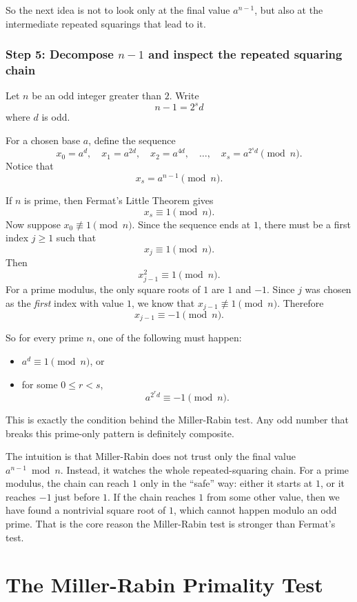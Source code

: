 \documentclass[12pt,a4paper]{report}
\begin{document}
So the next idea is not to look only at the final value \(a^{n-1}\), but also at the intermediate repeated squarings that lead to it.

\subsection{Step 5: Decompose \texorpdfstring{$n-1$}{n-1} and inspect the repeated squaring chain}
Let \(n\) be an odd integer greater than \(2\). Write
\[
n-1=2^s d
\]
where \(d\) is odd.

For a chosen base \(a\), define the sequence
\[
x_0=a^d,\quad x_1=a^{2d},\quad x_2=a^{4d},\quad \dots,\quad x_s=a^{2^s d}
\pmod{n}.
\]
Notice that
\[
x_s=a^{n-1}\pmod{n}.
\]

If \(n\) is prime, then Fermat's Little Theorem gives
\[
x_s\equiv 1 \pmod{n}.
\]
Now suppose \(x_0\not\equiv 1 \pmod{n}\). Since the sequence ends at \(1\), there must be a first index \(j\ge 1\) such that
\[
x_j\equiv 1 \pmod{n}.
\]
Then
\[
x_{j-1}^2\equiv 1 \pmod{n}.
\]
For a prime modulus, the only square roots of \(1\) are \(1\) and \(-1\). Since \(j\) was chosen as the \emph{first} index with value \(1\), we know that \(x_{j-1}\not\equiv 1 \pmod{n}\). Therefore
\[
x_{j-1}\equiv -1 \pmod{n}.
\]

So for every prime \(n\), one of the following must happen:
\begin{itemize}
    \item \(a^d\equiv 1 \pmod{n}\), or
    \item for some \(0\le r<s\),
    \[
    a^{2^r d}\equiv -1 \pmod{n}.
    \]
\end{itemize}

This is exactly the condition behind the Miller-Rabin test. Any odd number that breaks this prime-only pattern is definitely composite.

The intuition is that Miller-Rabin does not trust only the final value \(a^{n-1}\bmod n\). Instead, it watches the whole repeated-squaring chain. For a prime modulus, the chain can reach \(1\) only in the ``safe'' way: either it starts at \(1\), or it reaches \(-1\) just before \(1\). If the chain reaches \(1\) from some other value, then we have found a nontrivial square root of \(1\), which cannot happen modulo an odd prime. That is the core reason the Miller-Rabin test is stronger than Fermat's test.

\chapter{The Miller-Rabin Primality Test}
\end{document}
